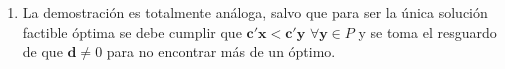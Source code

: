 \begin{enumerate}
Por lo tanto, $\mathbf{x}$ es óptimo.

\item[(b)]
La demostración es totalmente análoga, salvo que para ser la única solución factible óptima se debe cumplir que $\mathbf{c}'\mathbf{x} < \mathbf{c}'\mathbf{y}$ $\forall \mathbf{y} \in P$ y se toma el resguardo de que $\mathbf{d} \neq 0$ para no encontrar más de un óptimo.

\end{enumerate}
